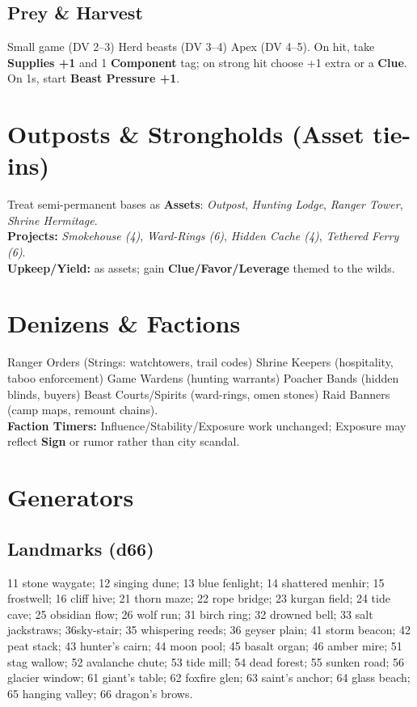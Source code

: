 \documentclass[11pt]{article}
\begin{document}
\subsection{Prey \& Harvest}
Small game (DV 2--3) \textbullet{} Herd beasts (DV 3--4) \textbullet{} Apex (DV 4--5). On hit, take \textbf{Supplies +1} and 1 \textbf{Component} tag; on strong hit choose +1 extra or a \textbf{Clue}. On 1s, start \textbf{Beast Pressure +1}.

\section{Outposts \& Strongholds (Asset tie-ins)}
Treat semi-permanent bases as \textbf{Assets}: \emph{Outpost}, \emph{Hunting Lodge}, \emph{Ranger Tower}, \emph{Shrine Hermitage}.\\
\textbf{Projects:} \emph{Smokehouse (4)}, \emph{Ward-Rings (6)}, \emph{Hidden Cache (4)}, \emph{Tethered Ferry (6)}.\\
\textbf{Upkeep/Yield:} as assets; gain \textbf{Clue/Favor/Leverage} themed to the wilds.

\section{Denizens \& Factions}
Ranger Orders (Strings: watchtowers, trail codes) \textbullet{} Shrine Keepers (hospitality, taboo enforcement) \textbullet{} Game Wardens (hunting warrants) \textbullet{} Poacher Bands (hidden blinds, buyers) \textbullet{} Beast Courts/Spirits (ward-rings, omen stones) \textbullet{} Raid Banners (camp maps, remount chains).\\
\textbf{Faction Timers:} Influence/Stability/Exposure work unchanged; Exposure may reflect \textbf{Sign} or rumor rather than city scandal.

\section{Generators}
\subsection{Landmarks (d66)}
11 stone waygate; 12 singing dune; 13 blue fenlight; 14 shattered menhir; 15 frostwell; 16 cliff hive; 21 thorn maze; 22 rope bridge; 23 kurgan field; 24 tide cave; 25 obsidian flow; 26 wolf run; 31 birch ring; 32 drowned bell; 33 salt jackstraws; 36sky-stair; 35 whispering reeds; 36 geyser plain; 41 storm beacon; 42 peat stack; 43 hunter's cairn; 44 moon pool; 45 basalt organ; 46 amber mire; 51 stag wallow; 52 avalanche chute; 53 tide mill; 54 dead forest; 55 sunken road; 56 glacier window; 61 giant's table; 62 foxfire glen; 63 saint's anchor; 64 glass beach; 65 hanging valley; 66 dragon's brows.
\end{document}
